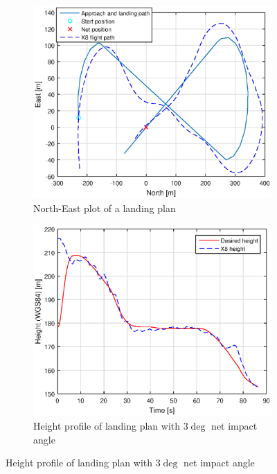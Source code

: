 \begin{figure}[H]
\begin{subfigure}[H]{1\textwidth}
	\centering
		\includegraphics[width=1\textwidth]{figs/Experiment/NorthEast31mai103029.eps}
		\caption{North-East plot of a landing plan}
		\label{Fig:NorthEast31mai103029}
\end{subfigure}
\begin{subfigure}[H]{1\textwidth}
		\includegraphics[width=1\textwidth]{figs/Experiment/Height31mai103029.eps}
		\caption{Height profile of landing plan with $3 \deg$ net impact angle}
		\label{Fig:Height31mai103029}
\end{subfigure}
\end{figure}




